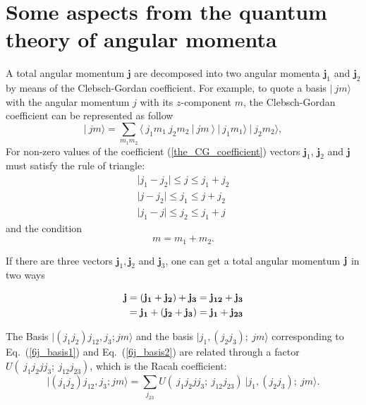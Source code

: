 \documentclass[
12pt, %
oneside, %
english, %
onehalfspacing, %
headsepline, %
]{MastersDoctoralThesis} %
\begin{document}
\label{Chapter1} %



\section{Some aspects from the quantum theory of angular momenta}
A total angular momentum $\mathbf{j}$ are decomposed into two angular momenta $\mathbf{j}_1$ and $\mathbf{j}_2$ by means of the Clebsch-Gordan coefficient. For example, to quote a basis $\vert ~ jm \rangle $ with the angular momentum $ j$ with its $z$-component $m$, the Clebsch-Gordan coefficient can be represented as follow
\begin{equation}
\label{the_CG_coefficient}
\vert ~ jm \rangle =\sum_{m_1 m_2} \langle ~ j_1 m_1~j_2 m_2~ \vert ~j m~  \rangle ~ \vert ~j_1 m_1 \rangle~ \vert ~j_2 m_2 \rangle,
\end{equation}
For non-zero values of the coefficient (\ref{the_CG_coefficient}) vectors $\mathbf{j}_1$, $\mathbf{j}_2$ and $\mathbf{j}$ must satisfy the rule of triangle:
\begin{align*}
\vert j_1 - j_2 \vert \leq j \leq j_1 + j_2 \\
\vert j - j_2 \vert \leq j_1 \leq j + j_2 \\ 
\vert j_1 - j \vert \leq j_2 \leq j_1 + j 
\end{align*}
and the condition
\begin{equation*}
m=m_1+m_2.
\end{equation*}


If there are three vectors $\mathbf{j}_1, \mathbf{j}_2$ and $\mathbf{j}_3$, one can get a total angular momentum $\bf j$ in two ways

\begin{align}
\label{6j_basis1}
\bf j & =\bf \left( j_1 + j_2 \right) + j_3 = j_{12} + j_3 \\
\label{6j_basis2}		
& = \bf j_1 + \left( j_2  + j_3 \right) = j_1 +j_{23}
\end{align}

The Basis $ \vert (j_1 j_2)j_{12},j_3; jm \rangle$ and the basis $\vert j_1,(j_2 j_3); ~jm \rangle$ corresponding to Eq.~(\ref{6j_basis1}) and Eq.~(\ref{6j_basis2}) are related through a factor $U(~j_1 j_2 j j_3;~ j_{12} j_{23})$, which is the Racah coefficient:
\begin{equation}
\vert (j_1 j_2)j_{12},j_3; jm \rangle = \sum_{j_{23}} U(~j_1 j_2 j j_3;~ j_{12} j_{23}) ~ \vert j_1,(j_2 j_3); ~jm \rangle.
\end{equation}
\end{document}
